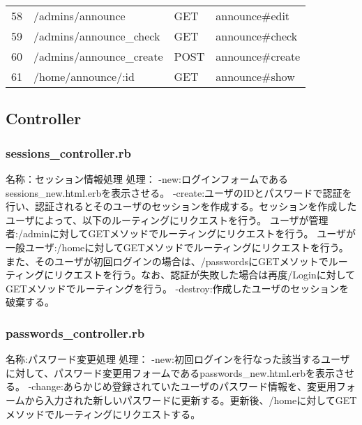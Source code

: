\documentclass[a4j]{jarticle}
\begin{document}
\begin{table}[H]
\begin{tabular}{|c|l|l||l|}
    58 & /admins/announce & GET & announce\#edit \\
    59 & /admins/announce\_check & GET & announce\#check \\
    60 & /admins/announce\_create & POST & announce\#create \\
    61 & /home/announce/:id & GET & announce\#show \\ \hline
  \end{tabular}
\end{table}



\subsection{Controller}
\subsubsection{sessions\_controller.rb}
\noindent 名称：セッション情報処理	\newline
処理： \newline
-new:ログインフォームであるsessions\_new.html.erbを表示させる。\newline
-create:ユーザのIDとパスワードで認証を行い、認証されるとそのユーザのセッションを作成する。セッションを作成したユーザによって、以下のルーティングにリクエストを行う。\newline
ユーザが管理者:/adminに対してGETメソッドでルーティングにリクエストを行う。\newline
ユーザが一般ユーザ:/homeに対してGETメソッドでルーティングにリクエストを行う。また、そのユーザが初回ログインの場合は、/passwordsにGETメソットでルーティングにリクエストを行う。なお、認証が失敗した場合は再度/Loginに対してGETメソッドでルーティングを行う。\newline
-destroy:作成したユーザのセッションを破棄する。

\subsubsection{passwords\_controller.rb}
\noindent 名称:パスワード変更処理	\newline
処理：\newline
-new:初回ログインを行なった該当するユーザに対して、パスワード変更用フォームであるpasswords\_new.html.erbを表示させる。\newline
-change:あらかじめ登録されていたユーザのパスワード情報を、変更用フォームから入力された新しいパスワードに更新する。更新後、/homeに対してGETメソッドでルーティングにリクエストする。
\end{document}
